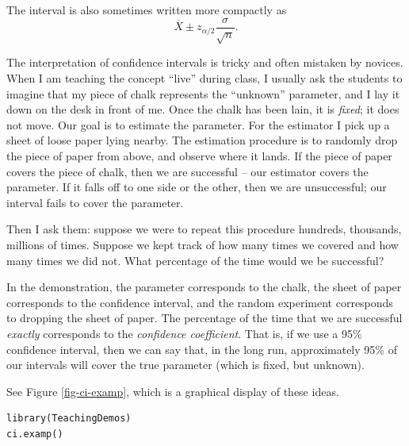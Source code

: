 \documentclass[captions=tableheading]{scrbook}
\begin{document}
\begin{rem}
The interval is also sometimes written more compactly as
\begin{equation}
\overline{X}\pm z_{\alpha/2}\frac{\sigma}{\sqrt{n}}.\label{eq-z-interval}
\end{equation}
\end{rem}

The interpretation of confidence intervals is tricky and often mistaken by novices. When I am teaching the concept ``live'' during class, I usually ask the students to imagine that my piece of chalk represents the ``unknown'' parameter, and I lay it down on the desk in front of me. Once the chalk has been lain, it is \emph{fixed}; it does not move. Our goal is to estimate the parameter. For the estimator I pick up a sheet of loose paper lying nearby. The estimation procedure is to randomly drop the piece of paper from above, and observe where it lands. If the piece of paper covers the piece of chalk, then we are successful -- our estimator covers the parameter. If it falls off to one side or the other, then we are unsuccessful; our interval fails to cover the parameter.

Then I ask them: suppose we were to repeat this procedure hundreds, thousands, millions of times. Suppose we kept track of how many times we covered and how many times we did not. What percentage of the time would we be successful?

In the demonstration, the parameter corresponds to the chalk, the sheet of paper corresponds to the confidence interval, and the random experiment corresponds to dropping the sheet of paper. The percentage of the time that we are successful \emph{exactly} corresponds to the \emph{confidence coefficient}. That is, if we use a 95\% confidence interval, then we can say that, in the long run, approximately 95\% of our intervals will cover the true parameter (which is fixed, but unknown). 

See Figure \ref{fig-ci-examp}, which is a graphical display of these ideas.


\begin{verbatim}
library(TeachingDemos)
ci.examp()
\end{verbatim}
\end{document}
